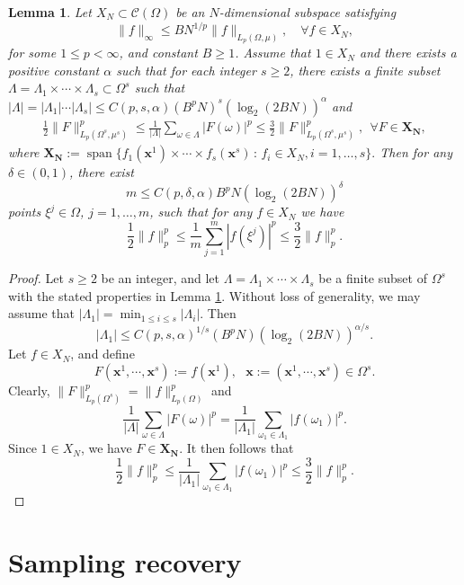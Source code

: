 \documentclass[12pt]{article}
\def\C{{\mathcal C}}
\def\Og{\Omega}
\def\al{\alpha}
\def \sp{\operatorname{span}}
\def\bx{\mathbf x}
\def\bN{\mathbf N}
\def\bX{\mathbf X}
\def\Ld{\Lambda}
\def\Og{\Omega}
\def\og{\omega}
\newtheorem{Lemma}{Lemma}[section]
\numberwithin{equation}{section}
\newcommand{\be}{\begin{equation}}
\newcommand{\ee}{\end{equation}}
\begin{document}
  \begin{Lemma} \label{lem3.2}
 Let  $X_N\subset \C(\Og)$ be an 
  	$N$-dimensional  subspace satisfying 
  	\be\label{A3.11}
  	\|f\|_\infty \le  B N^{1/p}\|f\|_{L_p(\Og, \mu)}, \quad \forall f\in X_N,
  	\ee
  for some $1\leq p<\infty$, and  constant $B\ge 1$.  	  	Assume that $1\in X_N$ and   there exists a  positive constant $\alpha$ such that  for  each integer $s\ge 2$,  
  there exists a  finite  subset  $\Ld=\Ld_1\times\cdots\times  \Ld_s\subset  \Og^s$ such that  
   $
 |\Ld|= |\Ld_1|\cdots |\Ld_s| \le C(p,s,\al) (B^pN)^s \left(\log_2(2B  N)\right)^\alpha$
   and 
   	\begin{align*}
   \frac{1}{2}\|F\|_{L_p(\Og^s, \mu^s)}^p \le \frac{1}{|\Ld|}\sum_{\og\in\Ld} |F(\og)|^p \le \frac{3}{2}\|F\|_{L_p(\Og^s, \mu^s)}^p,\  \ \forall F\in\bX_{\bN},
   \end{align*}
   where 
   $
   \bX_{\bN} := \sp\{ f_1(\bx^1)\times\cdots\times f_s(\bx^s)\,:\, f_i\in X_N, i=1,\dots,s\}.
   $
    Then for  any $\delta\in (0, 1)$, there exist 
  	$$
  	m \le C(p,\delta,\al) B^{p}N(\log_2 (2BN))^\delta 
  	$$
  	points $\xi^j\in \Omega$, $j=1,\dots,m$,   such that for any $f\in X_N$
  	we have
  	$$
  	\frac12\|f\|_p^p \le \frac{1}{m}\sum_{j=1}^m |f(\xi^j)|^p \le \frac 32\|f\|_p^p.
  	$$
  	\end{Lemma}
\begin{proof} Let $s\ge 2$ be an integer, and let $\Ld=\Ld_1\times\cdots\times  \Ld_s$ be a finite subset of $\Og^s$ with the stated properties in Lemma \ref{lem3.2}. 
Without loss of generality, we may assume that $|\Ld_1|=\min_{1\leq i\leq s} |\Ld_i|$. Then 
\[ |\Ld_1|\leq C(p, s,\al)^{1/s}   (B^p N) (\log_2 (2BN))^{\al/s}.\]
Let  $f\in X_N$, and define  
$$F(\bx^1,\cdots, \bx^s):=f(\bx^1),\   \   \    \bx:=(\bx^1,\cdots, \bx^s) \in\Og^s.$$
 Clearly, 
$\|F\|_{L_p(\Og^s)}^p=\|f\|_{L_p(\Og)}^p $
and 
$$ \frac{1}{|\Ld|}\sum_{\og\in\Ld} |F(\og)|^p=\frac 1 {|\Ld_1|} \sum_{\og_1\in\Ld_1} |f(\og_1)|^p.$$	
Since $1\in X_N$, we have $F\in\bX_{\bN}$. It then follows that 
\[ \frac 12 \|f\|_p^p \leq \frac 1 {|\Ld_1|} \sum_{\og_1\in\Ld_1} |f(\og_1)|^p \leq \frac 32 \|f\|_p^p.\]
	\end{proof}
	


 
\section{Sampling recovery}
\label{sr}
\end{document}
